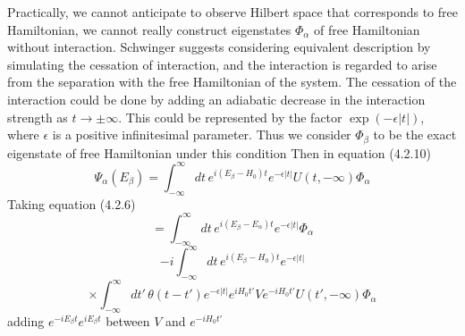 \documentclass[12pt]{article}
\numberwithin{equation}{subsection}
\begin{document}
Practically, we cannot anticipate to observe Hilbert space that corresponds to free Hamiltonian, we cannot really construct eigenstates $\Phi_{\alpha}$ of free Hamiltonian without interaction.
Schwinger suggests considering equivalent description by simulating the cessation of interaction, and the interaction is regarded to arise from the separation with the free Hamiltonian of the system.
The cessation of the interaction could be done by adding an adiabatic decrease in the interaction strength as $t\rightarrow\pm\infty$.
This could be represented by the factor $\exp(-\epsilon\left|t\right|)$, where $\epsilon$ is a positive infinitesimal parameter.
Thus we consider $\Phi_{\beta}$ to be the exact eigenstate of free Hamiltonian under this condition
Then in equation (4.2.10)
\begin{equation}
    \Psi_{\alpha}(E_{\beta}) = \int_{-\infty}^{\infty}{dt\,e^{i(E_{\beta}-H_0)t}e^{-\epsilon\left|t\right|}U(t,-\infty)\Phi_{\alpha}}
\end{equation}
Taking equation (4.2.6)
\[=\int_{-\infty}^{\infty}{dt\,e^{i(E_{\beta}-E_{\alpha})t}e^{-\epsilon|t|}\Phi_{\alpha}}\]
\[ -i \int_{-\infty}^{\infty}{dt\,e^{i(E_{\beta}-H_0)t}e^{-\epsilon|t|}}\]
\[\times\int_{-\infty}^{\infty}{dt'\,\theta(t-t')e^{-\epsilon|t|}e^{iH_0t'}Ve^{-iH_0t'}U(t',-\infty)\Phi_{\alpha}}\]
adding $e^{-iE_{\beta}t}e^{iE_{\beta}t}$ between $V$ and $e^{-iH_0t'}$


\end{document}
